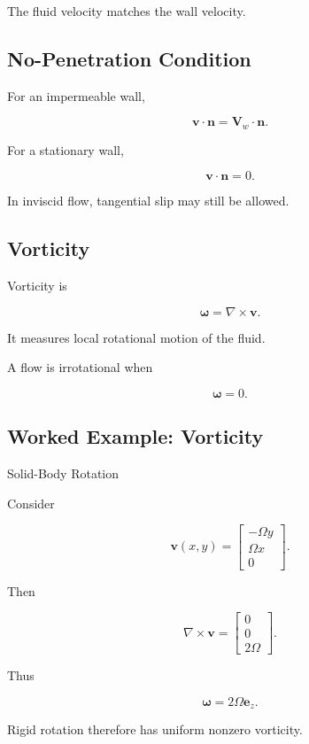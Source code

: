 The fluid velocity matches the wall velocity.

\subsection{No-Penetration Condition}
\label{subsec:no-penetration-condition}

For an impermeable wall,

\[
\boxed{
\mathbf{v}\cdot\mathbf{n}
=
\mathbf{V}_w\cdot\mathbf{n}.
}
\]

For a stationary wall,

\[
\boxed{
\mathbf{v}\cdot\mathbf{n}=0.
}
\]

In inviscid flow, tangential slip may still be allowed.

\subsection{Vorticity}
\label{subsec:fluid-vorticity}

Vorticity is

\[
\boxed{
\boldsymbol{\omega}
=
\nabla\times\mathbf{v}.
}
\]

It measures local rotational motion of the fluid.

A flow is irrotational when

\[
\boxed{
\boldsymbol{\omega}=0.
}
\]

\subsection{Worked Example: Vorticity}
\label{subsec:worked-vorticity}

\begin{workedexamplebox}{Solid-Body Rotation}

Consider

\[
\mathbf{v}(x,y)
=
\begin{bmatrix}
-\Omega y\\
\Omega x\\
0
\end{bmatrix}.
\]

Then

\[
\nabla\times\mathbf{v}
=
\begin{bmatrix}
0\\
0\\
2\Omega
\end{bmatrix}.
\]

Thus

\begin{answerbox}
\[
\boxed{
\boldsymbol{\omega}
=
2\Omega\mathbf{e}_z.
}
\]
\end{answerbox}

Rigid rotation therefore has uniform nonzero vorticity.

\end{workedexamplebox}


